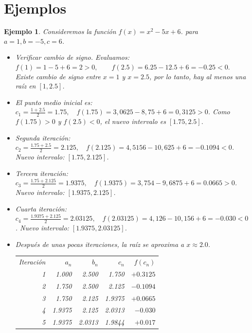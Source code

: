 \documentclass[12pt]{article}
\newtheorem{Ejem}{Ejemplo}%
\begin{document}
\section{Ejemplos}

\begin{Ejem}
Consideremos la funci\'on $f(x) = x^2 - 5x + 6$. para $a=1,b=-5,c=6$.  

\begin{itemize}
\item Verificar cambio de signo.  
Evaluamos:
$f(1) = 1 - 5 + 6 = 2 > 0, \qquad f(2.5) = 6.25 - 12.5 + 6 = -0.25 < 0.$
Existe cambio de signo entre $x=1$ y $x=2.5$, por lo tanto, hay al menos una raíz en $[1,2.5]$.

\item  El punto medio inicial es: $c_1 = \frac{1+2.5}{2} = 1.75, \quad f(1.75) = 3,0625 - 8,75 + 6 = 0,3125 > 0$. Como $f(1.75)>0$ y $f(2.5)<0$, el nuevo intervalo es $[1.75,2.5]$.

\item Segunda iteración: $c_2 = \frac{1.75+2.5}{2} = 2.125, \quad f(2.125) = 4,5156 - 10,625 + 6 = -0.1094 < 0$. Nuevo intervalo: $[1.75,2.125]$.

\item Tercera iteración: $c_3 = \frac{1.75+2.125}{2} = 1.9375, \quad f(1.9375) = 3,754 - 9,6875 + 6 = 0.0665 > 0$. Nuevo intervalo: $[1.9375,2.125]$.

\item  Cuarta iteración:$c_4 = \frac{1.9375+2.125}{2} = 2.03125, \quad f(2.03125) = 4,126 - 10,156 + 6 = -0.030 < 0$. Nuevo intervalo: $[1.9375,2.03125]$.

\item Después de unas pocas iteraciones, la raíz se aproxima a $x\approx 2.0$.

\begin{center}
\begin{tabular}{@{}rrrrr@{}}
Iteración & $a_n$ & $b_n$ & $c_n$ & $f(c_n)$ \\
1 & 1.000 & 2.500 & 1.750 & $+0.3125$ \\
2 & 1.750 & 2.500 & 2.125 & $-0.1094$ \\
3 & 1.750 & 2.125 & 1.9375 & $+0.0665$ \\
4 & 1.9375 & 2.125 & 2.0313 & $-0.030$ \\
5 & 1.9375 & 2.0313 & 1.9844 & $+0.017$ \\
\end{tabular}
\end{center}

\end{itemize}
\end{Ejem}
\end{document}
